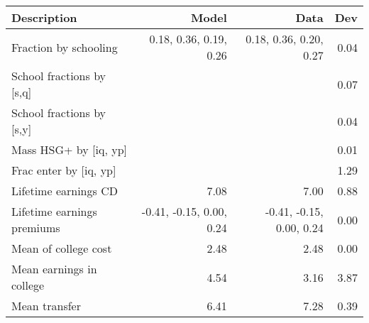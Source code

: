 \begin{tabular}{lrrr}
\hline
Description & Model  & Data  & Dev  \\ 
\hline
Fraction by schooling & 0.18, 0.36, 0.19, 0.26  & 0.18, 0.36, 0.20, 0.27  & 0.04  \\ 
School fractions by [s,q] &   &   & 0.07  \\ 
School fractions by [s,y] &   &   & 0.04  \\ 
Mass HSG+ by [iq, yp] &   &   & 0.01  \\ 
Frac enter by [iq, yp] &   &   & 1.29  \\ 
Lifetime earnings CD & 7.08  & 7.00  & 0.88  \\ 
Lifetime earnings premiums & -0.41, -0.15, 0.00, 0.24  & -0.41, -0.15, 0.00, 0.24  & 0.00  \\ 
Mean of college cost & 2.48  & 2.48  & 0.00  \\ 
Mean earnings in college & 4.54  & 3.16  & 3.87  \\ 
Mean transfer & 6.41  & 7.28  & 0.39  \\ 
\hline
\end{tabular}%
